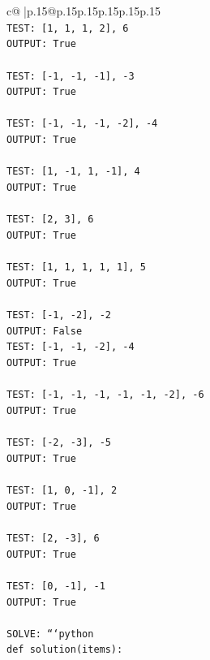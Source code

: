 \documentclass{article}
\begin{document}
{\begin{supertabular}{c@{$\;$}|p{.15\linewidth}@{}p{.15\linewidth}p{.15\linewidth}p{.15\linewidth}p{.15\linewidth}p{.15\linewidth}}
{{{\\ 
\texttt{TEST: {[}1, 1, 1, 2{]}, 6} \\
\texttt{OUTPUT: True} \\
\\ 
\texttt{TEST: {[}{-}1, {-}1, {-}1{]}, {-}3} \\
\texttt{OUTPUT: True} \\
\\ 
\texttt{TEST: {[}{-}1, {-}1, {-}1, {-}2{]}, {-}4} \\
\texttt{OUTPUT: True} \\
\\ 
\texttt{TEST: {[}1, {-}1, 1, {-}1{]}, 4} \\
\texttt{OUTPUT: True} \\
\\ 
\texttt{TEST: {[}2, 3{]}, 6} \\
\texttt{OUTPUT: True} \\
\\ 
\texttt{TEST: {[}1, 1, 1, 1, 1{]}, 5} \\
\texttt{OUTPUT: True} \\
\\ 
\texttt{TEST: {[}{-}1, {-}2{]}, {-}2} \\
\texttt{OUTPUT: False} \\
\texttt{TEST: {[}{-}1, {-}1, {-}2{]}, {-}4} \\
\texttt{OUTPUT: True} \\
\\ 
\texttt{TEST: {[}{-}1, {-}1, {-}1, {-}1, {-}1, {-}2{]}, {-}6} \\
\texttt{OUTPUT: True} \\
\\ 
\texttt{TEST: {[}{-}2, {-}3{]}, {-}5} \\
\texttt{OUTPUT: True} \\
\\ 
\texttt{TEST: {[}1, 0, {-}1{]}, 2} \\
\texttt{OUTPUT: True} \\
\\ 
\texttt{TEST: {[}2, {-}3{]}, 6} \\
\texttt{OUTPUT: True} \\
\\ 
\texttt{TEST: {[}0, {-}1{]}, {-}1} \\
\texttt{OUTPUT: True} \\
\\ 
\texttt{SOLVE: ```python} \\
\texttt{def solution(items):} \\
}}}
\end{supertabular}}
\end{document}
